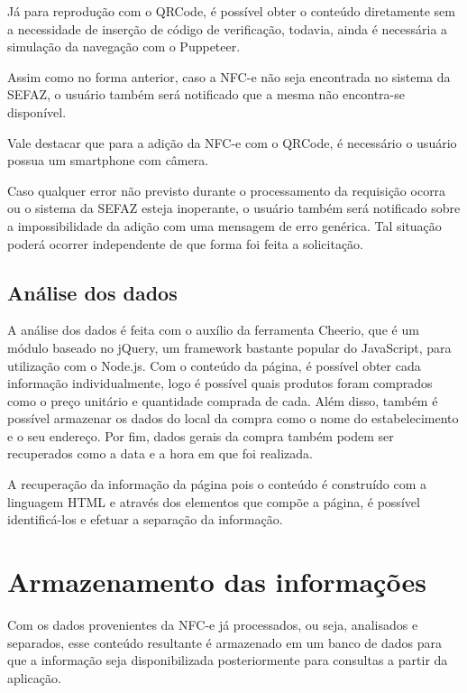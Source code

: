 Já para reprodução com o QRCode, é possível obter o conteúdo diretamente sem a necessidade de inserção de código de verificação, todavia, ainda é necessária a simulação da navegação com o Puppeteer.

Assim como no forma anterior, caso a NFC-e não seja encontrada no sistema da SEFAZ, o usuário também será notificado que a mesma não encontra-se disponível.

Vale destacar que para a adição da NFC-e com o QRCode, é necessário o usuário possua um smartphone com câmera.

Caso qualquer error não previsto durante o processamento da requisição ocorra ou o sistema da SEFAZ esteja inoperante, o usuário também será notificado sobre a impossibilidade da adição com uma mensagem de erro genérica. Tal situação poderá ocorrer independente de que forma foi feita a solicitação.

\subsection{Análise dos dados}

A análise dos dados é feita com o auxílio da ferramenta Cheerio, que é um módulo baseado no jQuery, um framework bastante popular do JavaScript, para utilização com o Node.js. Com o conteúdo da página, é possível obter cada informação individualmente, logo é possível quais produtos foram comprados como o preço unitário e quantidade comprada de cada. Além disso, também é possível armazenar os dados do local da compra como o nome do estabelecimento e o seu endereço. Por fim, dados gerais da compra também podem ser recuperados como a data e a hora em que foi realizada.

A recuperação da informação da página pois o conteúdo é construído com a linguagem HTML e através dos elementos que compõe a página, é possível identificá-los e efetuar a separação da informação.

\section{Armazenamento das informações}
\label{armazenamentoInfo}

Com os dados provenientes da NFC-e já processados, ou seja, analisados e separados, esse conteúdo resultante é armazenado em um banco de dados para que a informação seja disponibilizada posteriormente para consultas a partir da aplicação.

